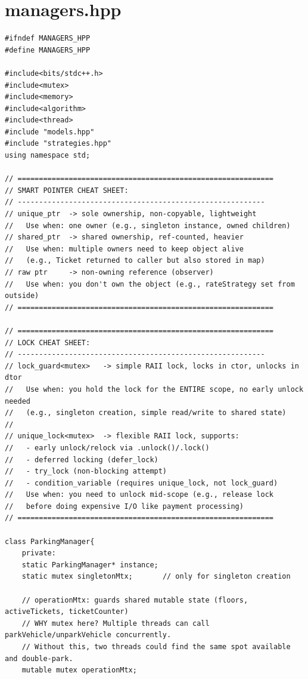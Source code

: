 \documentclass[11pt,a4paper]{article}
\begin{document}
\section{managers.hpp}
\begin{lstlisting}[title={\texttt{managers.hpp}}]
#ifndef MANAGERS_HPP
#define MANAGERS_HPP

#include<bits/stdc++.h>
#include<mutex>
#include<memory>
#include<algorithm>
#include<thread>
#include "models.hpp"
#include "strategies.hpp"
using namespace std;

// ============================================================
// SMART POINTER CHEAT SHEET:
// ----------------------------------------------------------
// unique_ptr  -> sole ownership, non-copyable, lightweight
//   Use when: one owner (e.g., singleton instance, owned children)
// shared_ptr  -> shared ownership, ref-counted, heavier
//   Use when: multiple owners need to keep object alive
//   (e.g., Ticket returned to caller but also stored in map)
// raw ptr     -> non-owning reference (observer)
//   Use when: you don't own the object (e.g., rateStrategy set from outside)
// ============================================================

// ============================================================
// LOCK CHEAT SHEET:
// ----------------------------------------------------------
// lock_guard<mutex>   -> simple RAII lock, locks in ctor, unlocks in dtor
//   Use when: you hold the lock for the ENTIRE scope, no early unlock needed
//   (e.g., singleton creation, simple read/write to shared state)
//
// unique_lock<mutex>  -> flexible RAII lock, supports:
//   - early unlock/relock via .unlock()/.lock()
//   - deferred locking (defer_lock)
//   - try_lock (non-blocking attempt)
//   - condition_variable (requires unique_lock, not lock_guard)
//   Use when: you need to unlock mid-scope (e.g., release lock
//   before doing expensive I/O like payment processing)
// ============================================================

class ParkingManager{
    private:
    static ParkingManager* instance;
    static mutex singletonMtx;       // only for singleton creation

    // operationMtx: guards shared mutable state (floors, activeTickets, ticketCounter)
    // WHY mutex here? Multiple threads can call parkVehicle/unparkVehicle concurrently.
    // Without this, two threads could find the same spot available and double-park.
    mutable mutex operationMtx;


\end{lstlisting}
\end{document}
